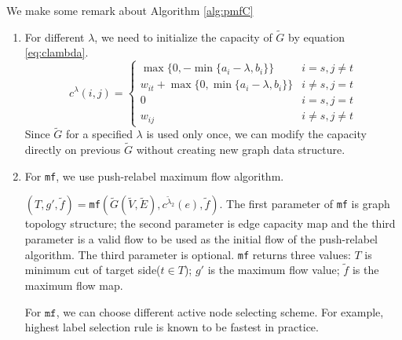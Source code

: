 \documentclass{article}
\begin{document}
We make some remark about Algorithm \ref{alg:pmfC}
\begin{enumerate}
\item For different $\lambda$, we need to initialize the capacity of $\widetilde{G}$ by equation \eqref{eq:clambda}.
\begin{equation}\label{eq:clambda}
c^{\lambda}(i, j) = 
\begin{cases}
\max\{0, -\min\{a_i-\lambda, b_i\}\} &  i = s, j \neq t \\
w_{it} + \max\{0, \min\{a_i - \lambda, b_i\}\} & i\neq s, j = t\\
0 & i = s, j = t\\
w_{ij} & i \neq s, j \neq t
\end{cases}
\end{equation}
Since $\widetilde{G}$ for a specified $\lambda$ is used only once, we can modify the capacity directly on previous $\widetilde{G}$ without creating new graph data structure.

\item For \texttt{mf}, we use push-relabel maximum flow algorithm\cite{Goldberg}.

 $(T,g',\tilde{f})=$\texttt{mf}$(\widetilde{G}(\widetilde{V}, \widetilde{E}), c^{\tilde{\lambda}_2}(e), \tilde{f})$. The first parameter of \texttt{mf} is graph topology structure; the second parameter is edge capacity map and the third parameter is a valid flow to be used as the initial flow of the push-relabel algorithm. The third parameter is optional. \texttt{mf} returns three values: $T$ is minimum cut of target side($t\in T$); $g'$ is the maximum flow value; $\tilde{f}$ is the maximum flow map.

For $\texttt{mf}$, we can choose different active node selecting scheme. For example, highest label selection rule is known to be fastest in practice.


\end{enumerate}
\end{document}
